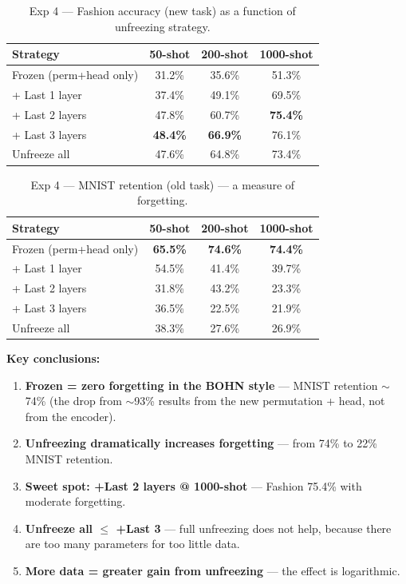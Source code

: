 \documentclass[11pt,a4paper]{report}
\begin{document}
\begin{table}[h!]
\centering
\caption{Exp 4 --- Fashion accuracy (new task) as a function of unfreezing strategy.}
\begin{tabular}{l c c c}
\hline
\textbf{Strategy} & \textbf{50-shot} & \textbf{200-shot} & \textbf{1000-shot} \\
\hline
Frozen (perm+head only) & 31.2\% & 35.6\% & 51.3\% \\
+ Last 1 layer & 37.4\% & 49.1\% & 69.5\% \\
+ Last 2 layers & 47.8\% & 60.7\% & \textbf{75.4\%} \\
+ Last 3 layers & \textbf{48.4\%} & \textbf{66.9\%} & 76.1\% \\
Unfreeze all & 47.6\% & 64.8\% & 73.4\% \\
\hline
\end{tabular}
\label{tab:cpu_exp4_fashion}
\end{table}

\begin{table}[h!]
\centering
\caption{Exp 4 --- MNIST retention (old task) --- a measure of forgetting.}
\begin{tabular}{l c c c}
\hline
\textbf{Strategy} & \textbf{50-shot} & \textbf{200-shot} & \textbf{1000-shot} \\
\hline
Frozen (perm+head only) & \textbf{65.5\%} & \textbf{74.6\%} & \textbf{74.4\%} \\
+ Last 1 layer & 54.5\% & 41.4\% & 39.7\% \\
+ Last 2 layers & 31.8\% & 43.2\% & 23.3\% \\
+ Last 3 layers & 36.5\% & 22.5\% & 21.9\% \\
Unfreeze all & 38.3\% & 27.6\% & 26.9\% \\
\hline
\end{tabular}
\label{tab:cpu_exp4_mnist}
\end{table}

\textbf{Key conclusions:}
\begin{enumerate}
    \item \textbf{Frozen = zero forgetting in the BOHN style} --- MNIST retention $\sim$74\%
          (the drop from $\sim$93\% results from the new permutation + head, not from the encoder).
    \item \textbf{Unfreezing dramatically increases forgetting} --- from 74\% to 22\% MNIST retention.
    \item \textbf{Sweet spot: +Last 2 layers @ 1000-shot} --- Fashion 75.4\% with moderate forgetting.
    \item \textbf{Unfreeze all $\leq$ +Last 3} --- full unfreezing does not help,
          because there are too many parameters for too little data.
    \item \textbf{More data = greater gain from unfreezing} --- the effect is logarithmic.
\end{enumerate}
\end{document}

